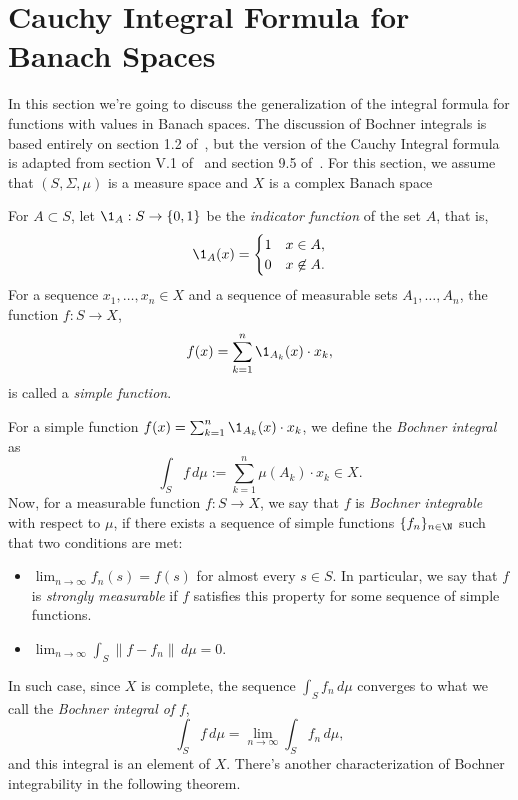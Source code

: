 
\section{Cauchy Integral Formula for Banach Spaces}

In this section we're going to discuss the generalization of the integral formula for functions with values in Banach spaces. The discussion of Bochner integrals is based entirely on section 1.2 of~\cite{hytönen2016analysis}, but the version of the Cauchy Integral formula is adapted from section V.1 of~\cite{taylor1986introduction} and section 9.5 of~\cite{taylor2012general}. For this section, we assume that $(S,\Sigma, \mu)$ is a measure space and $X$ is a complex Banach space

\begin{definition}\label{def:simple_function}\label{def:indicator_function}
    For $A\subset S$, let $\1_{A}: S \to \{0,1\}$ be the \textit{indicator function} of the set $A$, that is,
    \[ \1_A(x) = \begin{cases}
        1 & x\in A,\\
        0 & x \not\in A.
    \end{cases} \]
    For a sequence $x_1,\ldots, x_n \in X$ and a sequence of measurable sets $A_1,\ldots, A_n$, the function $f: S \to X$,
    \[ f(x) = \sum_{k = 1}^n \1_{A_k}(x) \cdot x_k, \]
    is called a \textit{simple function}.
\end{definition}

\begin{definition}\label{def:bochner_integral}\label{def:bochner_integrable}\label{def:strongly_measurable}
    For a simple function $f(x) = \sum_{k = 1}^n \1_{A_k}(x) \cdot x_k$, we define the \textit{Bochner integral} as
    \[ \int_S f \, d\mu := \sum_{k = 1}^n \mu(A_k) \cdot x_k \in X. \]
    Now, for a measurable function $f:S\to X$, we say that $f$ is \textit{Bochner integrable} with respect to $\mu$, if there exists a sequence of simple functions $\{f_n\}_{n\in \N}$ such that two conditions are met:
    \begin{itemize}
        \item $\displaystyle \lim_{n\to\infty} f_n(s) = f(s)$ for almost every $s \in S$. In particular, we say that $f$ is \textit{strongly measurable} if $f$ satisfies this property for some sequence of simple functions.
        \item $\displaystyle \lim_{n\to\infty} \int_{S} \|f - f_n\|\, d\mu = 0$.
    \end{itemize}
    In such case, since $X$ is complete, the sequence $\int_S f_n\, d\mu$ converges to what we call the \textit{Bochner integral of} $f$,
    \[ \int_S f \, d\mu = \lim_{n\to\infty} \int_S f_n\, d\mu,\]
    and this integral is an element of $X$. There's another characterization of Bochner integrability in the following theorem.
\end{definition}

